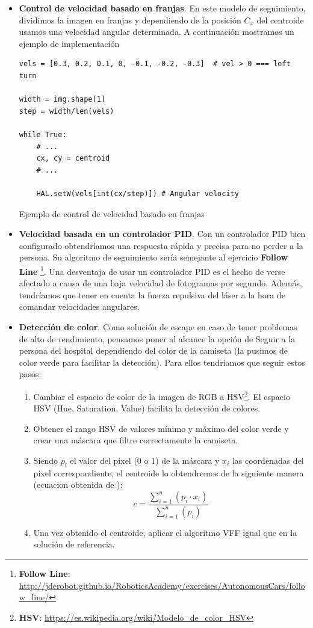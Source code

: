 \begin{itemize}
	\item \textbf{Control de velocidad basado en franjas}. En este modelo de seguimiento, dividimos la imagen en franjas y dependiendo de la posición $C_{x}$ del centroide usamos una velocidad angular determinada. A continuación mostramos un ejemplo de implementación
\begin{code}[H]
\begin{lstlisting}
vels = [0.3, 0.2, 0.1, 0, -0.1, -0.2, -0.3]	 # vel > 0 === left turn

width = img.shape[1]
step = width/len(vels)

while True:
	# ...
	cx, cy = centroid
	# ...
	
	HAL.setW(vels[int(cx/step)]) # Angular velocity
\end{lstlisting}
\caption{Ejemplo de control de velocidad basado en franjas}
\label{cod:vel_bar}
\end{code}
	\item \textbf{Velocidad basada en un controlador PID}. Con un controlador PID bien configurado obtendríamos una respuesta rápida y precisa para no perder a la persona. Su algoritmo de seguimiento sería semejante al ejercicio \textbf{Follow Line} \footnote{\textbf{Follow Line}: \url{http://jderobot.github.io/RoboticsAcademy/exercises/AutonomousCars/follow_line/}}. Una desventaja de usar un controlador PID es el hecho de verse afectado a causa de una baja velocidad de fotogramas por segundo. Además, tendríamos que tener en cuenta la fuerza repulsiva del láser a la hora de comandar velocidades angulares.
	\item \textbf{Detección de color}. Como solución de escape en caso de tener problemas de alto de rendimiento, pensamos poner al alcance la opción de Seguir a la persona del hospital dependiendo del color de la camiseta (la pusimos de color verde para facilitar la detección). Para ellos tendríamos que seguir estos pasos:
	\begin{enumerate}
		\item Cambiar el espacio de color de la imagen de RGB a HSV\footnote{\textbf{HSV}: \url{https://es.wikipedia.org/wiki/Modelo_de_color_HSV}}. El espacio HSV (Hue, Saturation, Value) facilita la detección de colores.
		\item Obtener el rango HSV de valores mínimo y máximo del color verde y crear una máscara que filtre correctamente la camiseta.
		\item Siendo $p_{i}$ el valor del pixel (0 o 1) de la máscara y $x_i$ las coordenadas del pixel correspondiente, el centroide lo obtendremos de la siguiente manera (ecuacion obtenida de \cite{centroide_ecuacion}):
		\begin{equation*}
		c = \frac{\sum_{i=1}^n\left(p_i \cdot x_i\right)}{\sum_{i=1}^n\left(p_i\right)}
		\end{equation*}
		\item Una vez obtenido el centroide, aplicar el algoritmo VFF igual que en la solución de referencia.
	\end{enumerate}
\end{itemize}

